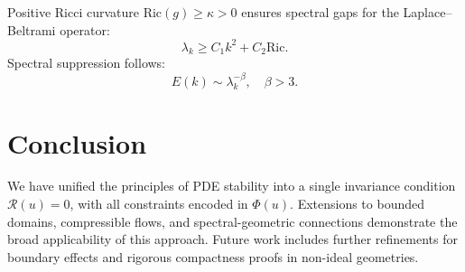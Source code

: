 \documentclass[12pt]{article}
\begin{document}
Positive Ricci curvature \(\text{Ric}(g) \geq \kappa > 0\) ensures spectral gaps for the Laplace--Beltrami operator:
\begin{equation}
\lambda_k \geq C_1 k^2 + C_2 \text{Ric}.
\end{equation}
Spectral suppression follows:
\begin{equation}
E(k) \sim \lambda_k^{-\beta}, \quad \beta > 3.
\end{equation}

\section{Conclusion}
We have unified the principles of PDE stability into a single invariance condition \(\mathcal{R}(u) = 0\), with all constraints encoded in \(\Phi(u)\). Extensions to bounded domains, compressible flows, and spectral-geometric connections demonstrate the broad applicability of this approach. Future work includes further refinements for boundary effects and rigorous compactness proofs in non-ideal geometries.
\end{document}

